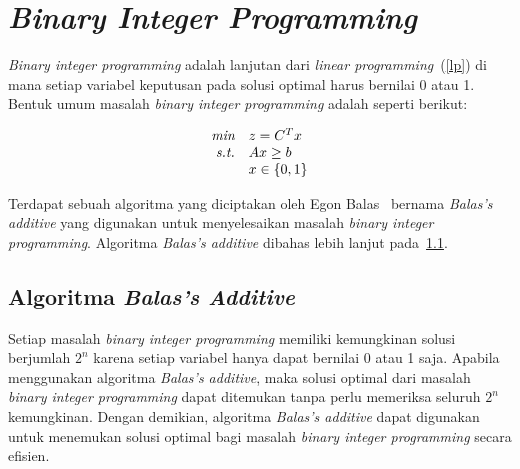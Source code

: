 %		
%		

\section{\textit{Binary Integer Programming}}
\label{sec:bip}
\textit{Binary integer programming} adalah lanjutan dari \textit{linear programming}~(\ref{lp}) di mana setiap variabel keputusan pada solusi optimal harus bernilai 0 atau 1. Bentuk umum masalah \textit{binary integer programming} adalah seperti berikut:

\begin{equation}
\begin{array}{r l}
\textit{min}   & z=C^Tx \\
\textit{s.t.} & Ax\geq b \\
& x \in \{0,1\}
\end{array}    
\end{equation}

Terdapat sebuah algoritma yang diciptakan oleh Egon Balas~\cite{balas1965additive} bernama \textit{Balas's additive} yang digunakan untuk menyelesaikan masalah \textit{binary integer programming}. Algoritma \textit{Balas's additive} dibahas lebih lanjut pada~\ref{balas_additive}.

\subsection{Algoritma \textit{Balas's Additive}}
\label{balas_additive}
Setiap masalah \textit{binary integer programming} memiliki kemungkinan solusi berjumlah \(2^n\) karena setiap variabel hanya dapat bernilai 0 atau 1 saja. Apabila menggunakan algoritma \textit{Balas's additive}, maka solusi optimal dari masalah \textit{binary integer programming} dapat ditemukan tanpa perlu memeriksa seluruh \(2^n\) kemungkinan. Dengan demikian, algoritma \textit{Balas's additive} dapat digunakan untuk menemukan solusi optimal bagi masalah \textit{binary integer programming} secara efisien.

